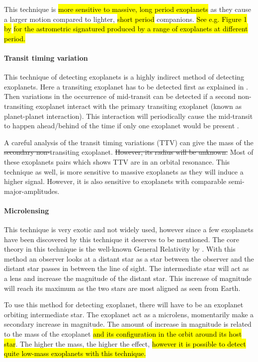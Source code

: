 This technique is \hl{more sensitive to massive, long period exoplanets} as they cause a larger
motion compared to lighter, \hl{short period} companions. \hl{See e.g. Figure 1 by}
\citet{Perryman2014} \hl{for the astrometric signatured produced by a range of exoplanets at
different period.}


\paragraph{Transit timing variation}

This technique of detecting exoplanets is a highly indirect method of detecting exoplanets. Here a
transiting exoplanet has to be detected first as explained in . Then
variations in the occurrence of mid-transit can be detected if a second non-transiting exoplanet
interact with the primary transiting exoplanet (known as planet-planet interaction). This
interaction will periodically cause the mid-transit to happen ahead/behind of the time if only one
exoplanet would be present \citep{Agol2005,Holman2005}.

A careful analysis of the transit timing variations (TTV) can give the mass of the \st{secondary
non-}transiting exoplanet. \st{However, its radius will be unknown.} Most of these exoplanets pairs
which shows TTV are in an orbital resonance. This technique as well, is more sensitive to massive
exoplanets as they will induce a higher signal. However, it is also sensitive to exoplanets with
comparable semi-major-amplitudes.


\paragraph{Microlensing}

This technique is very exotic and not widely used, however since a few exoplanets have been
discovered by this technique it deserves to be mentioned. The core theory in this technique is the
well-known General Relativity by \citet{Einstein1916}. With this method an observer looks at a
distant star as a star between the observer and the distant star passes in between the line of
sight. The intermediate star will act as a lens and increase the magnitude of the distant star. This
increase of magnitude will reach its maximum as the two stars are most aligned as seen from Earth.

To use this method for detecting exoplanet, there will have to be an exoplanet orbiting intermediate
star. The exoplanet act as a microlens, momentarily make a secondary increase in magnitude. The
amount of increase in magnitude is related to the mass of the exoplanet \hl{and its configuration in
the orbit around its host star}. The higher the mass, the higher the effect, \hl{however it is
possible to detect quite low-mass exoplanets with this technique.}

